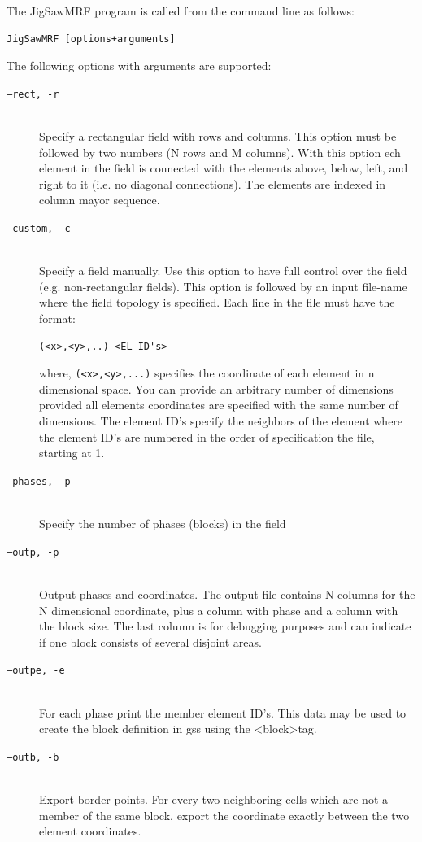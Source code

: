 \documentclass[12pt]{article}
\begin{document}
The JigSawMRF program is called from the command line as follows:
\begin{verbatim}
JigSawMRF [options+arguments]
\end{verbatim}
The following options with arguments are supported:
\begin{description}
\item [\texttt{--rect, -r}] \hfill \\ Specify a rectangular field with rows and columns. This option must be followed by two numbers (N rows and M columns). With this option ech element in the field is connected with the elements above, below, left, and right to it (i.e. no diagonal connections). The elements are indexed in column mayor sequence.  
\item [\texttt{--custom, -c}] \hfill \\ Specify a field manually. Use this option to have full control over the field (e.g. non-rectangular fields). This option is followed by an input file-name where the field topology is specified. Each line in the file must have the format:
\begin{verbatim}
(<x>,<y>,..) <EL ID's>
\end{verbatim}
where, \verb|(<x>,<y>,...)| specifies the coordinate of each element in n dimensional space. You can provide an arbitrary number of dimensions provided all elements coordinates are specified with the same number of dimensions. The element ID's specify the neighbors of the element where the element ID's are numbered in the order of specification the file, starting at 1. 
\item [\texttt{--phases, -p}] \hfill \\ Specify the number of phases (blocks) in the field
\item [\texttt{--outp, -p}] \hfill \\ Output phases and coordinates. The output file contains N columns for the N dimensional coordinate, plus a column with phase and a column with the block size. The last column is for debugging purposes and can indicate if one block consists of several disjoint areas.
\item [\texttt{--outpe, -e}] \hfill \\ For each phase print the member element ID's. This data may be used to create the block definition in gss using the \textless block\textgreater  tag. 
\item [\texttt{--outb, -b}] \hfill \\ Export border points. For every two neighboring cells which are not a member of the same block, export the coordinate exactly between the two element coordinates.  

\end{description}
\end{document}

